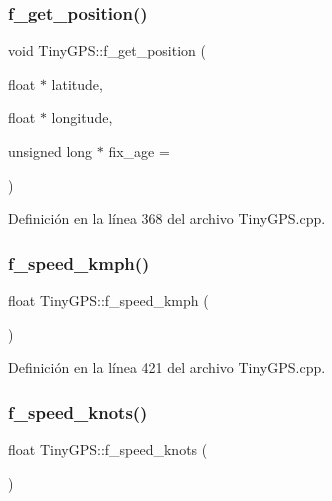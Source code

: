 \mbox{\label{class_tiny_g_p_s_a7deea07a7208113c9a37f25cf52d8580}} 
\subsubsection{\texorpdfstring{f\+\_\+get\+\_\+position()}{f\_get\_position()}}
{\footnotesize\ttfamily void Tiny\+G\+P\+S\+::f\+\_\+get\+\_\+position (\begin{DoxyParamCaption}\item[{float $\ast$}]{latitude,  }\item[{float $\ast$}]{longitude,  }\item[{unsigned long $\ast$}]{fix\+\_\+age = {} }\end{DoxyParamCaption})}



Definición en la línea 368 del archivo Tiny\+G\+P\+S.\+cpp.

\mbox{\label{class_tiny_g_p_s_a9cfc388eba14bd0d833958970b68763c}} 
\subsubsection{\texorpdfstring{f\+\_\+speed\+\_\+kmph()}{f\_speed\_kmph()}}
{\footnotesize\ttfamily float Tiny\+G\+P\+S\+::f\+\_\+speed\+\_\+kmph (\begin{DoxyParamCaption}{ }\end{DoxyParamCaption})}



Definición en la línea 421 del archivo Tiny\+G\+P\+S.\+cpp.

\mbox{\label{class_tiny_g_p_s_a176ace2182d5129f3f4fa4d22ee905fb}} 
\subsubsection{\texorpdfstring{f\+\_\+speed\+\_\+knots()}{f\_speed\_knots()}}
{\footnotesize\ttfamily float Tiny\+G\+P\+S\+::f\+\_\+speed\+\_\+knots (\begin{DoxyParamCaption}{ }\end{DoxyParamCaption})}



